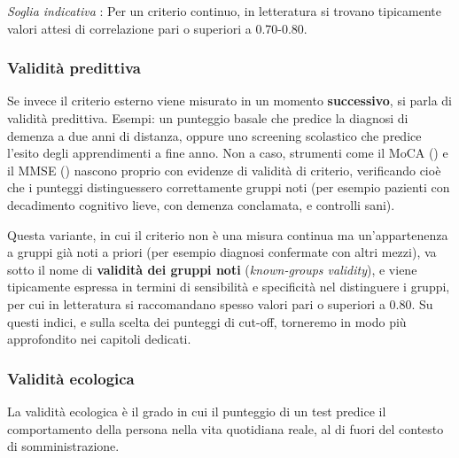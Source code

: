\documentclass[
  italian,
  letterpaper,
  paper=6in:9in,
  pagesize=pdftex,
  headinclude=on,
  footinclude=on,
  11pt]{scrbook}
\begin{document}
\emph{Soglia indicativa} : Per un criterio continuo, in letteratura si
trovano tipicamente valori attesi di correlazione pari o superiori a
0.70-0.80.

\subsubsection{Validità predittiva}\label{validituxe0-predittiva}

Se invece il criterio esterno viene misurato in un momento
\textbf{successivo}, si parla di validità predittiva. Esempi: un
punteggio basale che predice la diagnosi di demenza a due anni di
distanza, oppure uno screening scolastico che predice l'esito degli
apprendimenti a fine anno. Non a caso, strumenti come il MoCA
(\cite{nasreddine2005montreal}) e il MMSE (\cite{folstein1975mini})
nascono proprio con evidenze di validità di criterio, verificando cioè
che i punteggi distinguessero correttamente gruppi noti (per esempio
pazienti con decadimento cognitivo lieve, con demenza conclamata, e
controlli sani).

Questa variante, in cui il criterio non è una misura continua ma
un'appartenenza a gruppi già noti a priori (per esempio diagnosi
confermate con altri mezzi), va sotto il nome di \textbf{validità dei
gruppi noti} (\emph{known-groups validity}), e viene tipicamente
espressa in termini di sensibilità e specificità nel distinguere i
gruppi, per cui in letteratura si raccomandano spesso valori pari o
superiori a 0.80. Su questi indici, e sulla scelta dei punteggi di
cut-off, torneremo in modo più approfondito nei capitoli dedicati.

\subsubsection{Validità ecologica}\label{validituxe0-ecologica}

\begin{tcolorbox}[enhanced jigsaw, title=\textcolor{quarto-callout-note-color}{\faInfo}\hspace{0.5em}{Definizione}, coltitle=black, bottomtitle=1mm, colback=white, bottomrule=.15mm, rightrule=.15mm, breakable, toptitle=1mm, left=2mm, colbacktitle=quarto-callout-note-color!10!white, titlerule=0mm, colframe=quarto-callout-note-color-frame, leftrule=.75mm, opacitybacktitle=0.6, arc=.35mm, toprule=.15mm, opacityback=0]

La validità ecologica è il grado in cui il punteggio di un test predice
il comportamento della persona nella vita quotidiana reale, al di fuori
del contesto di somministrazione.

\end{tcolorbox}
\end{document}
